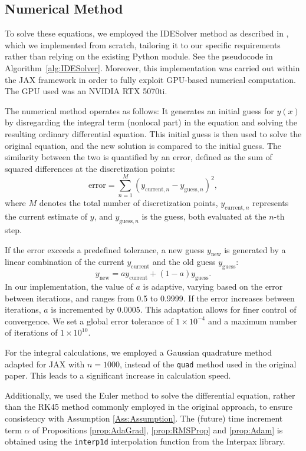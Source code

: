 \documentclass{article} %
\begin{document}
\subsection{Numerical Method}

To solve these equations, we employed the IDESolver method as described in \cite{GELMI2014}, which we implemented from scratch, tailoring it to our specific requirements rather than relying on the existing Python module. See the pseudocode in Algorithm~\ref{alg:IDESolver}. Moreover, this implementation was carried out within the JAX framework in order to fully exploit GPU-based numerical computation. The GPU used was an NVIDIA RTX 5070ti.

The numerical method operates as follows: It generates an initial guess for \( y(x) \) by disregarding the integral term (nonlocal part) in the equation and solving the resulting ordinary differential equation. This initial guess is then used to solve the original equation, and the new solution is compared to the initial guess. The similarity between the two is quantified by an error, defined as the sum of squared differences at the discretization points:
\[
\text{error} = \sum_{n=1}^{M} \left( y_{\text{current},n} - y_{\text{guess},n} \right)^2,
\]
where \( M \) denotes the total number of discretization points,  \( y_{\text{current},n} \) represents the current estimate of \( y \),  and \( y_{\text{guess},n} \) is the guess, both evaluated at the \( n \)-th step.

If the error exceeds a predefined tolerance, a new guess \( y_{\text{new}} \) is generated by a linear combination of the current \( y_{\text{current}} \) and the old guess $y_{\text{guess}}$:
\[
y_{\text{new}} = a y_{\text{current}} + (1 - a) y_{\text{guess}}.
\]
In our implementation, the value of \( a \) is adaptive, varying based on the error between iterations, and ranges from 0.5 to 0.9999. If the error increases between iterations, \( a \) is incremented by 0.0005. This adaptation allows for finer control of convergence. We set a global error tolerance of \( 1 \times 10^{-4} \) and a maximum number of iterations of \( 1 \times 10^{10} \).
    
For the integral calculations, we employed a Gaussian quadrature method adapted for JAX with $n=1000$, instead of the \texttt{quad} method used in the original paper. This leads to a significant increase in calculation speed. 

Additionally, we used the Euler method to solve the differential equation, rather than the RK45 method commonly employed in the original approach, to ensure consistency with Assumption \ref{Ass:Assumption}. The (future) time increment term \(\alpha\) of Propositions \ref{prop:AdaGrad}, \ref{prop:RMSProp} and \ref{prop:Adam} is obtained using the \texttt{interp1d} interpolation function from the Interpax library.
\end{document}
